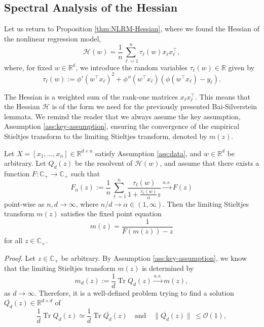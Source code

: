 \documentclass{article}
\begin{document}
\subsection{Spectral Analysis of the Hessian}\label{sec:mainresult1}
Let us return to Proposition \ref{thm:NLRM-Hessian}, where we found the Hessian of the nonlinear regression model,
\begin{equation}
\mathcal{H}(w)=\frac{1}{n}\sum_{\ell=1}^n\tau_\ell(w)x_\ell x_\ell^\top,
\end{equation}
where, for fixed $w\in\mathbb{R^d}$, we introduce the random variables $\tau_\ell(w)\in\mathbb{R}$ given by
\begin{equation}
\tau_\ell(w):=\phi'(w^\top x_\ell)^2+\phi''(w^\top x_\ell)(\phi(w^\top x_\ell)-y_\ell).\label{eq:def-tau}
\end{equation}
\par
The Hessian is a weighted sum of the rank-one matrices $x_\ell x_\ell^\top$. This means that the Hessian $\mathcal{H}$ is of the form we need for the previously presented Bai-Silverstein lemmata. We remind the reader that we always assume the key assumption, Assumption \ref{ass:key-assumption}, ensuring the convergence of the empirical Stieltjes transform to the limiting Stieltjes transform, denoted by $m(z)$.
\bigskip
\begin{theorem}\label{thm:mainresult-1} Let $X=[x_1,\dots,x_n]\in\mathbb{R}^{d\times n}$ satisfy Assumption \ref{ass:data}, and $w\in\mathbb{R}^d$ be arbitrary. Let $Q_d(z)$ be the resolvent of $\mathcal{H}(w)$, and assume that there exists a function $F:\mathbb{C}_+\to\mathbb{C}_+$ such that
$$F_n(z):=\frac{1}{n}\sum_{\ell=1}^n \frac{\tau_\ell(w)}{1+\frac{\tau_\ell(w)}{\alpha}z}\stackrel{a.s.}{\to}F(z)$$
point-wise as $n,d\to\infty$, where $n/d\to\alpha\in(1,\infty)$. Then the limiting Stieltjes transform $m(z)$ satisfies the fixed point equation
$$m(z)=\frac{1}{F(m(z))-z}$$
for all $z\in\mathbb{C}_+$.
\end{theorem}
\bigskip
\noindent
\emph{Proof.} Let $z\in\mathbb{C}_+$ be arbitrary. By Assumption \ref{ass:key-assumption}, we know that the limiting Stieltjes transform $m(z)$ is determined by
$$m_d(z):=\frac{1}{d}\operatorname{Tr}Q_d(z)\stackrel{a.s.}{\to}m(z),$$
as $d\to\infty$. Therefore, it is a well-defined problem trying to find a solution $\overline{Q_d}(z)\in\mathbb{R}^{d\times d}$ of
\begin{equation}
\frac{1}{d}\operatorname{Tr}Q_d(z)\simeq\frac{1}{d}\operatorname{Tr}\overline{Q_d}(z)\quad\text{and}\quad\|\overline{Q_d}(z)\|\,\leq\mathcal{O}(1),\label{eq:deterministic-equiv}
\end{equation}
\end{document}
